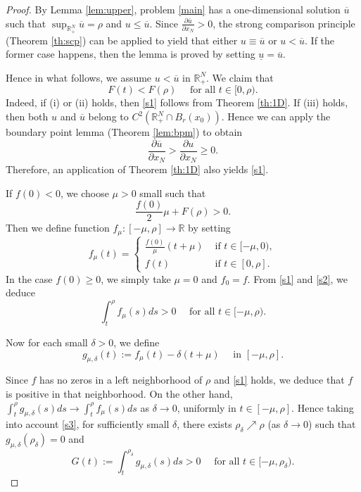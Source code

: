 \documentclass[10pt,a4paper]{amsart}
\begin{document}
\begin{proof}
		By Lemma \ref{lem:upper}, problem \eqref{main} has a one-dimensional solution $\overline u$ such that $\sup_{\mathbb{R}^N_+} \overline u = \rho$ and $u \le \overline u$. Since $\frac{\partial\overline u}{\partial x_N}>0$, the strong comparison principle (Theorem \ref{th:scp}) can be applied to yield that either $u \equiv \overline u$ or $u < \overline u$. If the former case happens, then the lemma is proved by setting $\underline u = \overline u$.
		
		Hence in what follows, we assume $u < \overline u$ in $\mathbb{R}^N_+$. We claim that
		\begin{equation}\label{s1}
			F(t) < F(\rho) \quad\text{ for all } t\in[0,\rho).
		\end{equation}	
		Indeed, if (i) or (ii) holds, then \eqref{s1} follows from Theorem \ref{th:1D}.
		If (iii) holds, then both $u$ and $\overline u$ belong to $C^2(\mathbb{R}^N_+\cap B_r(x_0))$. Hence we can apply the boundary point lemma (Theorem \ref{lem:bpm}) to obtain
		\[
		\frac{\partial \overline u}{\partial x_N}>\frac{\partial u}{\partial x_N}\ge0.
		\]
		Therefore, an application of Theorem \ref{th:1D} also yields \eqref{s1}.
		
		If $f (0) < 0$, we choose $\mu>0$ small such that
		\begin{equation}\label{s2}
			\frac{f(0)}{2}\mu + F(\rho) > 0.
		\end{equation}
		Then we define function $f_\mu:[-\mu,\rho]\to\mathbb{R}$ by setting
		\[
		f_\mu(t) =
		\begin{cases}
			\frac{f(0)}{\mu}(t+\mu) & \text{ if } t\in[-\mu,0),\\
			f(t) & \text{ if } t\in[0,\rho].
		\end{cases}
		\]
		In the case $f (0) \ge 0$, we simply take $\mu = 0$ and $f_0 = f$. From \eqref{s1} and \eqref{s2}, we deduce
		\begin{equation}\label{s3}
			\int_{t}^{\rho} f_\mu(s) ds > 0 \quad\text{ for all } t\in[-\mu,\rho).
		\end{equation}
		
		Now for each small $\delta>0$, we define
		\[
		g_{\mu,\delta}(t) := f_\mu(t) - \delta (t+\mu) \quad\text{ in } [-\mu,\rho].
		\]
		
		Since $f$ has no zeros in a left neighborhood of $\rho$ and \eqref{s1} holds, we deduce that $f$ is positive in that neighborhood. On the other hand, $\int_{t}^{\rho} g_{\mu,\delta}(s) ds \to \int_{t}^{\rho} f_\mu(s) ds$ as $\delta\to0$, uniformly in $t\in[-\mu,\rho]$. Hence taking into account \eqref{s3}, for sufficiently small $\delta$, there exists $\rho_\delta\nearrow\rho$ (as $\delta\to0$) such that $g_{\mu,\delta}(\rho_\delta)=0$ and
		\[
		G(t):=\int_{t}^{\rho_\delta} g_{\mu,\delta}(s) ds > 0 \quad\text{ for all } t \in [-\mu, \rho_\delta).
		\]
		

\end{proof}
\end{document}
